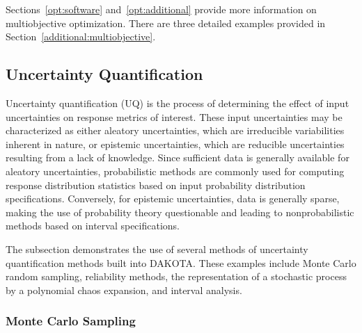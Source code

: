Sections~\ref{opt:software} and~\ref{opt:additional} provide more
information on multiobjective optimization.  There are three detailed
examples provided in Section~\ref{additional:multiobjective}.

\subsection{Uncertainty Quantification}\label{tutorial:example:uncert_quant}

Uncertainty quantification (UQ) is the process of determining the
effect of input uncertainties on response metrics of interest.  These
input uncertainties may be characterized as either aleatory
uncertainties, which are irreducible variabilities inherent in nature,
or epistemic uncertainties, which are reducible uncertainties
resulting from a lack of knowledge.  Since sufficient data is
generally available for aleatory uncertainties, probabilistic methods
are commonly used for computing response distribution statistics based
on input probability distribution specifications.  Conversely, for
epistemic uncertainties, data is generally sparse, making the use of
probability theory questionable and leading to nonprobabilistic
methods based on interval specifications.

The subsection demonstrates the use of several methods of uncertainty 
quantification methods built into DAKOTA.  These examples include 
Monte Carlo random sampling, reliability methods, the representation 
of a stochastic process by a polynomial chaos expansion, 
and interval analysis.  

\subsubsection{Monte Carlo Sampling}\label{tutorial:example:uncert_quant:monte_carlo}


